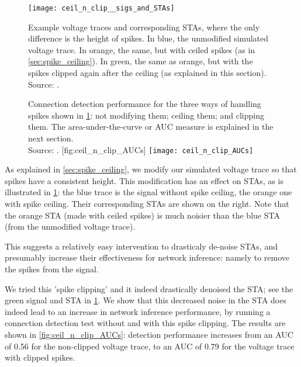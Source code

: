 \begin{figure}
    \texttt{[image: ceil\_n\_clip\_\_sigs\_and\_STAs]}
    \caption
        {Example voltage traces and corresponding STAs, where the only difference is the height of spikes. In blue, the unmodified simulated voltage trace. In orange, the same, but with ceiled spikes (as in \cref{sec:spike_ceiling}). In green, the same as orange, but with the spikes clipped again after the ceiling (as explained in this section).\\
        Source: .}
    \label{fig:ceil_n_clip__sigs_and_STAs}
\end{figure}

\begin{figure}
    \begin{sidecaption}
        {
            Connection detection performance for the three ways of handling spikes shown in \cref{fig:ceil_n_clip__sigs_and_STAs}: not modifying them; ceiling them; and clipping them.
            The area-under-the-curve or AUC measure is explained in the next section.\\
            Source: .
        }
        [fig:ceil_n_clip_AUCs]
        \texttt{[image: ceil\_n\_clip\_AUCs]}
    \end{sidecaption}
\end{figure}
%

As explained in \cref{sec:spike_ceiling}, we modify our simulated voltage trace so that spikes have a consistent height. This modification has an effect on STAs, as is illustrated in \cref{fig:ceil_n_clip__sigs_and_STAs}: the blue trace is the signal without spike ceiling, the orange one with spike ceiling. Their corresponding STAs are shown on the right. Note that the orange STA (made with ceiled spikes) is much noisier than the blue STA (from the unmodified voltage trace).

This suggests a relatively easy intervention to drasticaly de-noise STAs, and presumably increase their effectiveness for network inference: namely to remove the spikes from the signal.

We tried this 'spike clipping' and it indeed drastically denoised the STA; see the green signal and STA in \cref{fig:ceil_n_clip__sigs_and_STAs}.
We show that this decreased noise in the STA does indeed lead to an increase in network inference performance, by running a connection detection test without and with this spike clipping. The results are shown in \cref{fig:ceil_n_clip_AUCs}: detection performance increases from an AUC of 0.56 for the non-clipped voltage trace, to an AUC of 0.79 for the voltage trace with clipped spikes.



